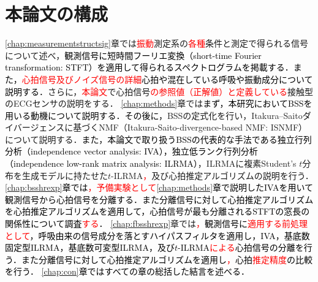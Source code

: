 \section{本論文の構成}
\ref{chap:measurementstructsig}章では\textcolor{red}{振動}測定系の\textcolor{red}{各種}条件と測定で得られる信号について述べ，\textcolor{black}{観測信号に短時間フーリエ変換（short-time Fourier transformation: STFT）を適用して得られるスペクトログラムを掲載する．また，\textcolor{red}{心拍信号及びノイズ信号の詳細}心拍や混在している呼吸や振動成分について説明する．}さらに，\textcolor{red}{本論文}で心拍信号\textcolor{red}{の参照値（正解値）と定義している}接触型のECGセンサの説明をする．
\ref{chap:methods}章では\textcolor{black}{まず，本研究においてBSSを用いる動機について説明する．その後に，}BSSの定式化を行い，Itakura--Saitoダイバージェンスに基づくNMF（Itakura-Saito-divergence-based NMF: ISNMF\textcolor{red}{\cite{isnmf}}）について説明する．\textcolor{black}{また，本論文で取り扱うBSSの代表的な手法である独立行列分析（independence vector analysis: IVA\textcolor{red}{\cite{Kim2007_iva, auxIVA}}），独立低ランク行列分析（independence low-rank matrix analysis: ILRMA\textcolor{red}{\cite{ILRMA, Kitamura2018_ilrma}}）}，ILRMAに複素Student's $t$分布を生成モデルに持たせた$t$-ILRMA\textcolor{red}{\cite{tdist1, tdist2}，}及び心拍推定アルゴリズムの説明を行う．
\textcolor{black}{\ref{chap:bsshrexp}章では\textcolor{red}{，予備実験として}\ref{chap:methods}章で説明したIVAを用いて観測信号から心拍信号を分離する．また分離信号に対して心拍推定アルゴリズムを心拍推定アルゴリズムを適用して，心拍信号が最も分離されるSTFTの窓長の関係性について調査\textcolor{red}{する}．}
\ref{chap:fbsshrexp}章では\textcolor{red}{，}\textcolor{black}{観測信号に\textcolor{red}{適用する前処理として}，呼吸由来の信号成分を落とすハイパスフィルタを適用し，IVA，基底数固定型ILRMA，基底数可変型ILRMA，及び$t$-ILRMA\textcolor{red}{による}心拍信号の分離を行う．また分離信号に対して心拍推定アルゴリズムを適用し\textcolor{red}{，}心拍\textcolor{red}{推定精度}の比較を行う．
\ref{chap:con}章ではすべての章の総括した結言を述べる．}